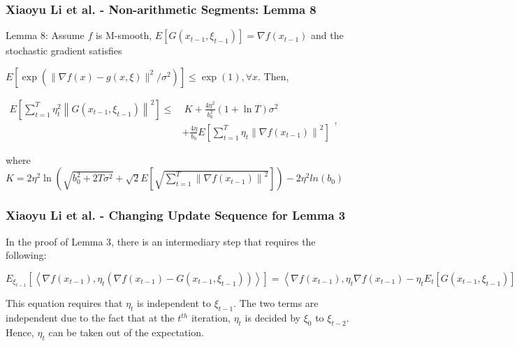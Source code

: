 \documentclass{beamer}
\begin{document}
\begin{frame}
\frametitle{Xiaoyu Li et al. - Non-arithmetic Segments: Lemma 8}
Lemma 8: Assume $f$ is M-smooth, $E[G(x_{t-1},\xi_{t-1})]=\nabla f(x_{t-1})$ and the stochastic gradient satisfies \par\vspace{3mm}$E\left[\exp \left(\|\nabla f(x)-g(x, \xi)\|^2 / \sigma^2\right)\right] \leq \exp (1), \forall x$. Then, \par\vspace{3mm}
$\begin{aligned} E\left[\sum_{t=1}^T \eta_t^2\left\|G\left(x_{t-1}, \xi_{t-1}\right)\right\|^2\right] \leq &\ K+\frac{4 \eta^2}{b_0^2}(1+\ln T) \sigma^2 \\ & +\frac{4 \eta}{b_0} E\left[\sum_{t=1}^T \eta_t\left\|\nabla f\left(x_{t-1}\right)\right\|^2\right]
\end{aligned}$, \par\vspace{3mm} where \\
$K=2 \eta^2 \ln \left(\sqrt{b_0^2+2 T \sigma^2}+\sqrt{2} E\left[\sqrt{\sum_{t=1}^T\left\|\nabla f\left(x_{t-1}\right)\right\|^2}\right]\right)-2\eta^2 ln(b_0)$
\end{frame}

\begin{frame}
\frametitle{Xiaoyu Li et al. - Changing Update Sequence for Lemma 3}
In the proof of Lemma 3, there is an intermediary step that requires the following:
\par\vspace{5mm}
$E_{\xi_{t-1}}\left[\left\langle\nabla f\left(x_{t-1}\right), \eta_t\left(\nabla f\left(x_{t-1}\right)-G\left(x_{t-1}, \xi_{t-1}\right)\right)\right\rangle\right]=\left\langle\nabla f\left(x_{t-1}\right), \eta_t \nabla f\left(x_{t-1}\right)-\eta_t E_t\left[G\left(x_{t-1}, \xi_{t-1}\right)\right]\right\rangle=0$
\par\vspace{5mm}
This equation requires that $\eta_t$ is independent to $\xi_{t-1}$. The two terms are independent due to the fact that at the $t^{th}$ iteration, $\eta_t$ is decided by $\xi_0$ to $\xi_{t-2}$. Hence, $\eta_t$ can be taken out of the expectation.
\end{frame}
\end{document}
